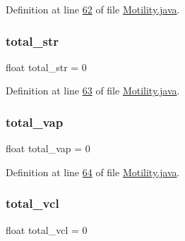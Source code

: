 Definition at line \hyperlink{_motility_8java_source_l00062}{62} of file \hyperlink{_motility_8java_source}{Motility.\+java}.

\hypertarget{classanalysis_1_1_motility_ae849455f41cc53bf86d72ca509155a83}{}\label{classanalysis_1_1_motility_ae849455f41cc53bf86d72ca509155a83} 
\subsubsection{\texorpdfstring{total\+\_\+str}{total\_str}}
{\footnotesize\ttfamily float total\+\_\+str = 0\hspace{0.3cm}{\ttfamily [private]}}



Definition at line \hyperlink{_motility_8java_source_l00063}{63} of file \hyperlink{_motility_8java_source}{Motility.\+java}.

\hypertarget{classanalysis_1_1_motility_ae4d5fa9ba9511057ab1b12594029ebd5}{}\label{classanalysis_1_1_motility_ae4d5fa9ba9511057ab1b12594029ebd5} 
\subsubsection{\texorpdfstring{total\+\_\+vap}{total\_vap}}
{\footnotesize\ttfamily float total\+\_\+vap = 0\hspace{0.3cm}{\ttfamily [private]}}



Definition at line \hyperlink{_motility_8java_source_l00064}{64} of file \hyperlink{_motility_8java_source}{Motility.\+java}.

\hypertarget{classanalysis_1_1_motility_a39e3cc2644471738bffd77164ecefa1a}{}\label{classanalysis_1_1_motility_a39e3cc2644471738bffd77164ecefa1a} 
\subsubsection{\texorpdfstring{total\+\_\+vcl}{total\_vcl}}
{\footnotesize\ttfamily float total\+\_\+vcl = 0\hspace{0.3cm}{\ttfamily [private]}}



